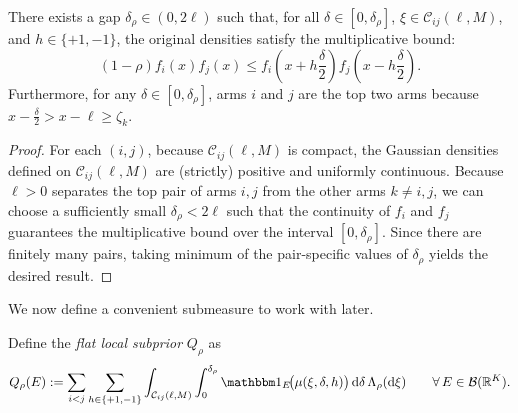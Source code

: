 \documentclass[10pt]{article}
\newcommand{\dd}{\mathrm{d}}
\theoremstyle{plain}
\begin{document}
\begin{lemma}
\label{lem:uniform-density}
There exists a gap $\delta_\rho \in (0,  2\ell)$ such that, for all $\delta \in [0, \delta_\rho]$,   $\xi \in \mathcal{C}_{ij}(\ell, M)$, and    $h \in \{+1, -1\}$, the original densities satisfy the multiplicative bound:
$$ (1-\rho)f_i(x)f_j(x)
\le
f_i\!\left(x + h\frac{\delta}{2}\right) f_j\!\left(x - h\frac{\delta}{2}\right). $$
Furthermore, for any $\delta \in [0, \delta_\rho]$, arms $i$ and $j$ are the  top two arms because $x-\frac{\delta}{2}>x-\ell\ge \zeta_k$. 
\end{lemma}
\begin{proof}
    For each $(i,j)$, because $\mathcal{C}_{ij}(\ell, M)$ is compact, the Gaussian densities defined on $\mathcal{C}_{ij}(\ell, M)$  are (strictly) positive and uniformly continuous. Because $\ell > 0$ separates the top pair of arms $i,j$ from the other arms $k \ne i,j$, we can choose a sufficiently small $\delta_\rho < 2\ell$ such that the continuity of $f_i$ and $f_j$ guarantees the multiplicative bound over the interval $[0,\delta_\rho]$. Since there are finitely many pairs, taking minimum of the pair-specific values of $\delta_\rho$ yields the desired result.  
\end{proof}

We now define a convenient submeasure to work with later. 

\begin{definition}
\label{def:flat-local-subprior}
Define the {\em  flat local subprior} $Q_\rho$ as
\begin{equation}
\label{eq:Q-rho-definition}
Q_\rho(E)
:=
\sum_{i<j}\sum_{h\in\{+1,-1\}}
\int_{\mathcal C_{ij}(\ell,M)}
\int_0^{\delta_\rho}
\mathbbm 1_E\!\bigl(\mu(\xi,\delta,h)\bigr)
\,\dd\delta\,\Lambda_\rho(\dd\xi)\qquad\forall\, E\in\mathcal{B}(\mathbb{R}^K).
\end{equation}
\end{definition}
\end{document}

